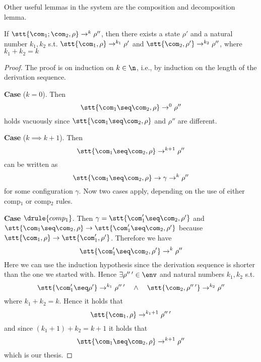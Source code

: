\noindent
Other useful lemmas in the system are the composition and
decomposition lemma.

\begin{lemma}\label{le:decomp}
  If \(\stt{\com_1;\com_2, \rho} \to^k \rho''\), then there exists a
  state \(\rho'\) and a natural number \(k_1, k_2\)
  s.t. \(\stt{\com_1, \rho} \to^{k_1} \rho'\) and
  \(\stt{\com_2, \rho'} \to^{k_2}\rho''\), where \(k_1 + k_2 = k\)
\end{lemma}

\begin{proof}
  The proof is on induction on \(k\in\n\), i.e., by induction on the
  length of the derivation sequence.

  \medskip

  \noindent
  \textbf{Case} (\(k = 0\)).  Then
  \begin{equation*}
    \stt{\com_1\seq\com_2, \rho} \to^0 \rho''
  \end{equation*}
  holds vacuously since \(\stt{\com_1\seq\com_2, \rho}\) and
  \(\rho''\) are different.

  \medskip

  \noindent
  \textbf{Case} (\(k \implies k+1\)). Then
  \begin{equation*}
    \stt{\com_1\seq\com_2, \rho} \to^{k+1} \rho''
  \end{equation*}
  can be written as
  \begin{equation*}
    \stt{\com_1\seq\com_2, \rho} \to \gamma \to^{k} \rho''
  \end{equation*}
  for some configuration \(\gamma\). Now two cases apply, depending on
  the use of either comp\(_1\) or comp\(_2\) rules.

  \medskip

  \textbf{Case} \(\drule{comp_1}\).  Then
  \({\gamma = \stt{\com_1'\seq\com_2, \rho'}}\) and
  \({\stt{\com_1\seq\com_2, \rho} \to \stt{\com_1'\seq\com_2,
      \rho'}}\) because
  \({\stt{\com_1, \rho}\to\stt{\com_1', \rho'}}\). Therefore we have
  \begin{equation*}
    \stt{\com_1'\seq\com_2, \rho'} \to^k \rho''
  \end{equation*}
  Here we can use the induction hypothesis since the derivation
  sequence is shorter than the one we started with. Hence
  \(\exists \rho''\,' \in \env\) and natural numbers \(k_1, k_2\) s.t.
  \begin{equation*}
    \stt{\com_1'\seq\rho'}\to^{k_1}\rho''\,' \quad \wedge \quad \stt{\com_2, \rho''\,'} \to^{k_2} \rho''
  \end{equation*}
  where \(k_1 + k_2 = k\). Hence it holds that
  \begin{equation*}
    \stt{\com_1, \rho} \to^{k_1+1} \rho''\,'
  \end{equation*}
  and since \((k_1 + 1) + k_2 = k + 1\) it holds that
  \begin{equation*}
    \stt{\com_1\seq\com_2, \rho} \to^{k+1} \rho''
  \end{equation*}
  which is our thesis.


\end{proof}
